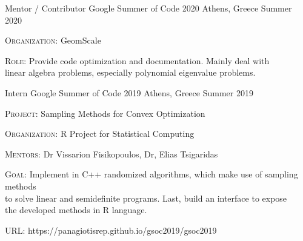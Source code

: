 

\begin{cventries}

\cventry
{Mentor / Contributor} %
{Google Summer of Code 2020} %
{Athens, Greece} %
{Summer 2020} %
{
	\begin{cvitems} %
		\item {{\fontsize{8pt}{1em}\bodyfont\scshape Organization}: GeomScale}
		\item {{\fontsize{8pt}{1em}\bodyfont\scshape Role}: Provide code optimization and documentation. Mainly
				deal with \\
			 linear algebra problems, especially polynomial eigenvalue problems.}
	\end{cvitems}
}

  \cventry
    {Intern} %
    {Google Summer of Code 2019} %
    {Athens, Greece} %
    {Summer 2019} %
    {
      \begin{cvitems} %
        \item {{\fontsize{8pt}{1em}\bodyfont\scshape Project}: Sampling Methods for Convex Optimization}
        \item {{\fontsize{8pt}{1em}\bodyfont\scshape Organization}: R Project for Statistical Computing}
        \item {{\fontsize{8pt}{1em}\bodyfont\scshape Mentors}: Dr Vissarion Fisikopoulos, Dr, Elias Tsigaridas}
        \item {{\fontsize{8pt}{1em}\bodyfont\scshape Goal}: Implement in C++ randomized algorithms, which make use of sampling methods \\
        	 to solve linear and semidefinite programs. Last, build an interface to expose\\
        	the developed methods in R language.}        
        \item {{\fontsize{8pt}{1em}\bodyfont\scshape URL}: https://panagiotisrep.github.io/gsoc2019/gsoc2019}
      \end{cvitems}
    }


\end{cventries}
